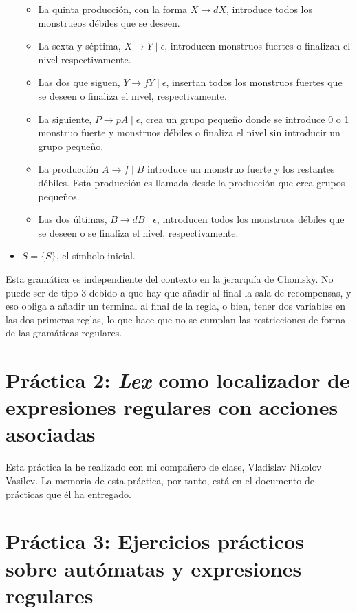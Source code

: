 \documentclass[11pt,a4paper]{article}
\begin{document}
\begin{itemize}
\begin{itemize}
			\item La quinta producción, con la forma $X\rightarrow dX$, introduce todos los monstrueos débiles que se deseen.
			\item La sexta y séptima, $X\rightarrow Y \mid \epsilon$, introducen monstruos fuertes o finalizan el nivel respectivamente.
			\item Las dos que siguen, $Y\rightarrow fY \mid \epsilon$, insertan todos los monstruos fuertes que se deseen o finaliza el nivel, respectivamente.
			\item La siguiente, $P\rightarrow pA \mid \epsilon$, crea un grupo pequeño donde se introduce 0 o 1 monstruo fuerte y monstruos débiles o finaliza el nivel sin introducir un grupo pequeño.
			\item La producción $A\rightarrow f\mid B$ introduce un monstruo fuerte y los restantes débiles. Esta producción es llamada desde la producción que crea grupos pequeños.
			\item Las dos últimas, $B\rightarrow dB \mid \epsilon$, introducen todos los monstruos débiles que se deseen o se finaliza el nivel, respectivamente.
		\end{itemize}
		\item $S=\{S\}$, el símbolo inicial.
	\end{itemize}
	
Esta gramática es independiente del contexto en la jerarquía de Chomsky. No puede ser de tipo 3 debido a que hay que añadir al final la sala de recompensas, y eso obliga a añadir un terminal al final de la regla, o bien, tener dos variables en las dos primeras reglas, lo que hace que no se cumplan las restricciones de forma de las gramáticas regulares.\\
	
\section{Práctica 2: \textit{Lex} como localizador de expresiones regulares con acciones asociadas}
Esta práctica la he realizado con mi compañero de clase, Vladislav Nikolov Vasilev. La memoria de esta práctica, por tanto, está en el documento de prácticas que él ha entregado.

\newpage

\section{Práctica 3: Ejercicios prácticos sobre autómatas y expresiones regulares}
\end{document}
